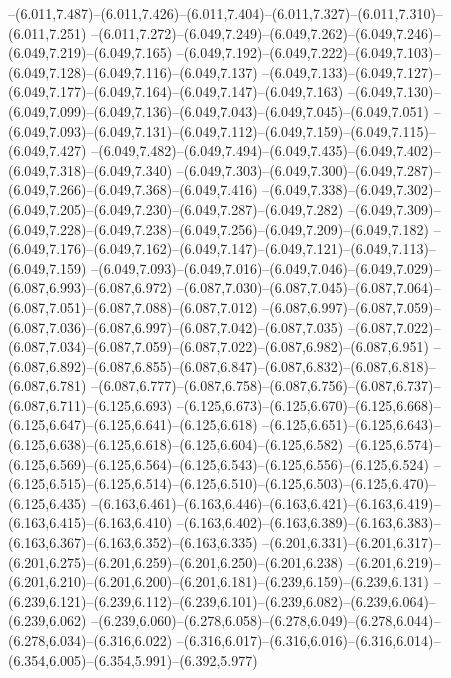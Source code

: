   --(6.011,7.487)--(6.011,7.426)--(6.011,7.404)--(6.011,7.327)--(6.011,7.310)--(6.011,7.251)%
  --(6.011,7.272)--(6.049,7.249)--(6.049,7.262)--(6.049,7.246)--(6.049,7.219)--(6.049,7.165)%
  --(6.049,7.192)--(6.049,7.222)--(6.049,7.103)--(6.049,7.128)--(6.049,7.116)--(6.049,7.137)%
  --(6.049,7.133)--(6.049,7.127)--(6.049,7.177)--(6.049,7.164)--(6.049,7.147)--(6.049,7.163)%
  --(6.049,7.130)--(6.049,7.099)--(6.049,7.136)--(6.049,7.043)--(6.049,7.045)--(6.049,7.051)%
  --(6.049,7.093)--(6.049,7.131)--(6.049,7.112)--(6.049,7.159)--(6.049,7.115)--(6.049,7.427)%
  --(6.049,7.482)--(6.049,7.494)--(6.049,7.435)--(6.049,7.402)--(6.049,7.318)--(6.049,7.340)%
  --(6.049,7.303)--(6.049,7.300)--(6.049,7.287)--(6.049,7.266)--(6.049,7.368)--(6.049,7.416)%
  --(6.049,7.338)--(6.049,7.302)--(6.049,7.205)--(6.049,7.230)--(6.049,7.287)--(6.049,7.282)%
  --(6.049,7.309)--(6.049,7.228)--(6.049,7.238)--(6.049,7.256)--(6.049,7.209)--(6.049,7.182)%
  --(6.049,7.176)--(6.049,7.162)--(6.049,7.147)--(6.049,7.121)--(6.049,7.113)--(6.049,7.159)%
  --(6.049,7.093)--(6.049,7.016)--(6.049,7.046)--(6.049,7.029)--(6.087,6.993)--(6.087,6.972)%
  --(6.087,7.030)--(6.087,7.045)--(6.087,7.064)--(6.087,7.051)--(6.087,7.088)--(6.087,7.012)%
  --(6.087,6.997)--(6.087,7.059)--(6.087,7.036)--(6.087,6.997)--(6.087,7.042)--(6.087,7.035)%
  --(6.087,7.022)--(6.087,7.034)--(6.087,7.059)--(6.087,7.022)--(6.087,6.982)--(6.087,6.951)%
  --(6.087,6.892)--(6.087,6.855)--(6.087,6.847)--(6.087,6.832)--(6.087,6.818)--(6.087,6.781)%
  --(6.087,6.777)--(6.087,6.758)--(6.087,6.756)--(6.087,6.737)--(6.087,6.711)--(6.125,6.693)%
  --(6.125,6.673)--(6.125,6.670)--(6.125,6.668)--(6.125,6.647)--(6.125,6.641)--(6.125,6.618)%
  --(6.125,6.651)--(6.125,6.643)--(6.125,6.638)--(6.125,6.618)--(6.125,6.604)--(6.125,6.582)%
  --(6.125,6.574)--(6.125,6.569)--(6.125,6.564)--(6.125,6.543)--(6.125,6.556)--(6.125,6.524)%
  --(6.125,6.515)--(6.125,6.514)--(6.125,6.510)--(6.125,6.503)--(6.125,6.470)--(6.125,6.435)%
  --(6.163,6.461)--(6.163,6.446)--(6.163,6.421)--(6.163,6.419)--(6.163,6.415)--(6.163,6.410)%
  --(6.163,6.402)--(6.163,6.389)--(6.163,6.383)--(6.163,6.367)--(6.163,6.352)--(6.163,6.335)%
  --(6.201,6.331)--(6.201,6.317)--(6.201,6.275)--(6.201,6.259)--(6.201,6.250)--(6.201,6.238)%
  --(6.201,6.219)--(6.201,6.210)--(6.201,6.200)--(6.201,6.181)--(6.239,6.159)--(6.239,6.131)%
  --(6.239,6.121)--(6.239,6.112)--(6.239,6.101)--(6.239,6.082)--(6.239,6.064)--(6.239,6.062)%
  --(6.239,6.060)--(6.278,6.058)--(6.278,6.049)--(6.278,6.044)--(6.278,6.034)--(6.316,6.022)%
  --(6.316,6.017)--(6.316,6.016)--(6.316,6.014)--(6.354,6.005)--(6.354,5.991)--(6.392,5.977)%

